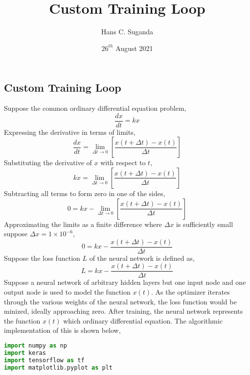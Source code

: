 \documentclass[a4paper, 12pt]{report}
\def\f{\frac}
\def\l{\left}
\def\r{\right}
\def\dst{\displaystyle}
\begin{document}
\title{Custom Training Loop}
\author{Hans C. Suganda}
\date{$26^{th}$ August 2021}
\maketitle
\newpage



\begin{center}
\section*{Custom Training Loop}
\begin{comment}
\end{comment}
Suppose the common ordinary differential equation problem,
$$\f{dx}{dt} = kx$$
Expressing the derivative in terms of limits,
$$\f{dx}{dt} = \lim_{\Delta t \to 0}\l[\f{x(t+\Delta t) - x(t)}{\Delta t}\r]$$
Substituting the derivative of $x$ with respect to $t$,
$$kx = \lim_{\Delta t \to 0}\l[\f{x(t+\Delta t) - x(t)}{\Delta t}\r]$$
Subtracting all terms to form zero in one of the sides,
$$0 = kx -\lim_{\Delta t \to 0}\l[\f{x(t+\Delta t) - x(t)}{\Delta t}\r]$$
Approximating the limits as a finite difference where $\Delta x$ is sufficiently small suppose $\dst{\Delta x = 1\times10^{-6}}$,
$$0 = kx -\f{x(t+\Delta t) - x(t)}{\Delta t}$$
Suppose the loss function $L$ of the neural network is defined as,
$$L = kx -\f{x(t+\Delta t) - x(t)}{\Delta t}$$
Suppose a neural network of arbitrary hidden layers but one input node and one output node is used to model the function $x(t)$. As the optimizer iterates through the various weights of the neural network, the loss function would be minized, ideally approaching zero. After training, the neural network represents the function $x(t)$ which ordinary differential equation. The algorithmic implementation of this is shown below,
\begin{lstlisting}[language = Python]
import numpy as np
import keras
import tensorflow as tf
import matplotlib.pyplot as plt


\end{lstlisting}
\end{center}
\end{document}
